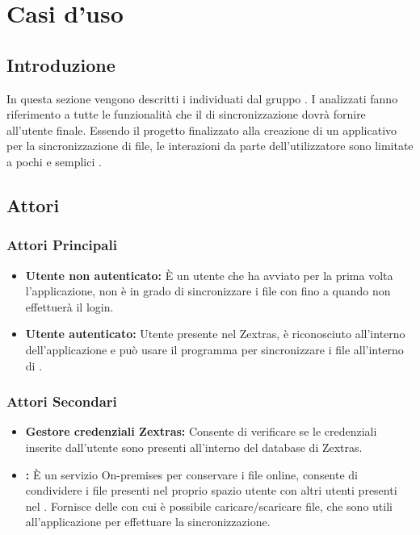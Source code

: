 \section{Casi d'uso}
\subsection{Introduzione}
In questa sezione vengono descritti i  individuati dal gruppo \gruppo{}.
I  analizzati fanno riferimento a tutte le funzionalità che il  di sincronizzazione dovrà fornire all'utente finale.\newline
Essendo il progetto finalizzato alla creazione di un applicativo per la sincronizzazione di file, le interazioni da parte dell'utilizzatore sono limitate a pochi e semplici .

\subsection{Attori}

\subsubsection{Attori Principali}
\begin{itemize}
\item \textbf{Utente non autenticato:} È un utente che ha avviato per la prima volta l'applicazione, non è in grado di sincronizzare i file con  fino a quando non effettuerà il login.
\item \textbf{Utente autenticato:} Utente presente nel  Zextras, è riconosciuto all'interno dell'applicazione e può usare il programma per sincronizzare i file all'interno di .
\end{itemize}

\subsubsection{Attori Secondari}
\begin{itemize}
\item \textbf{Gestore credenziali Zextras:} Consente di verificare se le credenziali inserite dall'utente sono presenti all'interno del database di Zextras.
\item \textbf{:} È un servizio On-premises per conservare i file online, consente di condividere i file presenti nel proprio spazio utente con altri utenti presenti nel . Fornisce delle  con cui è possibile caricare/scaricare file, che sono utili all'applicazione per effettuare la sincronizzazione.
\end{itemize}


